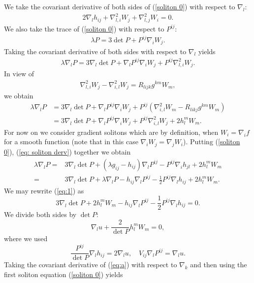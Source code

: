 \documentclass{amsart}
\theoremstyle{definition}
\theoremstyle{remark}
\numberwithin{equation}{section}
\begin{document}
We take the covariant derivative of both sides of (\ref{soliton 0}) with respect to $\nabla_l:$
\begin{align}\label{eq: soliton derv}
2\nabla_lh_{ij}+\nabla^2_{l,i}W_j+\nabla^2_{l,j}W_i=0.
\end{align}
We also take the trace of (\ref{soliton 0}) with respect to $P^{ij}$:
\begin{align}\label{trace}
\lambda P=3\det P+P^{ij}\nabla_iW_j.
\end{align}
Taking the covariant derivative of both sides with respect to $\nabla_l$ yields
\begin{align*}
\lambda \nabla_l P=3\nabla_l\det P+\nabla_l P^{ij}\nabla_iW_j+P^{ij}\nabla^2_{l,i}W_j.
\end{align*}
In view of
\begin{align*}
\nabla^2_{l,i}W_j-\nabla^2_{i,l}W_j=R_{lijk} g^{km}W_m,
\end{align*}
we obtain
\begin{align}\label{equ00}
\lambda \nabla_l P&=3\nabla_l\det P+\nabla_l P^{ij}\nabla_iW_j+P^{ij}(\nabla^2_{i,l}W_m -R_{likj}g^{km}W_m)\\
&=3\nabla_l\det P+\nabla_l P^{ij}\nabla_iW_j+P^{ij}\nabla^2_{i,l}W_j+2h_l^mW_m.\nonumber
\end{align}
For now on  we consider gradient solitons which are by definition, when $W_i=\nabla_if$ for a smooth function (note that in this case $\nabla_iW_j=\nabla_jW_i$).
Putting (\ref{soliton 0}), (\ref{eq: soliton derv}) together we obtain
\begin{align}\label{eq:1}
\lambda \nabla_l P
=&3\nabla_l\det P+(\lambda g_{ij}-h_{ij})\nabla_l P^{ij}-P^{ij}\nabla_ih_{jl}+2h_l^mW_m\\
=&3\nabla_l\det P+\lambda \nabla_l P-h_{ij}\nabla_l P^{ij}-\frac{1}{2}P^{ij}\nabla_lh_{ij}+2h_l^mW_m.\nonumber
\end{align}
We may rewrite (\ref{eq:1}) as
\[3\nabla_l\det P+2h_l^mW_m-h_{ij}\nabla_l P^{ij}-\frac{1}{2}P^{ij}\nabla_lh_{ij}=0.\]
We divide both sides by $\det P:$
\begin{equation}\label{eq:a}
\nabla_lu+\frac{2}{\det P}h_l^mW_m=0,
\end{equation}
where we used
\begin{equation}\label{eq0}
\frac{P^{ij}}{\det P}\nabla_lh_{ij}=2\nabla_lu,\quad V_{ij}\nabla_lP^{ij}=\nabla_lu.
\end{equation}
Taking the covariant derivative of (\ref{eq:a}) with respect to $\nabla_k$ and then using the first soliton equation (\ref{soliton 0}) yields
\end{document}
